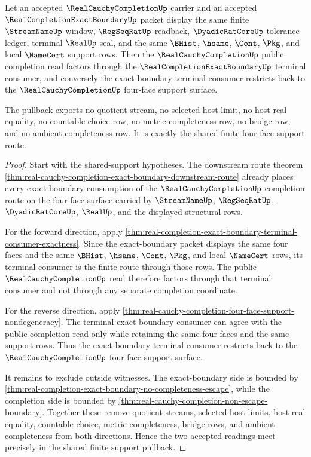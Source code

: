 \begin{theorem}
\label{thm:real-cauchy-completion-exact-boundary-bidirectional-pullback}
Let an accepted $\RealCauchyCompletionUp$ carrier and an accepted $\RealCompletionExactBoundaryUp$ packet display the same finite $\StreamNameUp$ window, $\RegSeqRatUp$ readback, $\DyadicRatCoreUp$ tolerance ledger, terminal $\RealUp$ seal, and the same $\BHist$, $\hsame$, $\Cont$, $\Pkg$, and local $\NameCert$ support rows. Then the $\RealCauchyCompletionUp$ public completion read factors through the $\RealCompletionExactBoundaryUp$ terminal consumer, and conversely the exact-boundary terminal consumer restricts back to the $\RealCauchyCompletionUp$ four-face support surface.

The pullback exports no quotient stream, no selected host limit, no host real equality, no countable-choice row, no metric-completeness row, no bridge row, and no ambient completeness row. It is exactly the shared finite four-face support route.
\end{theorem}
\begin{proof}
Start with the shared-support hypotheses. The downstream route theorem \autoref{thm:real-cauchy-completion-exact-boundary-downstream-route} already places every exact-boundary consumption of the $\RealCauchyCompletionUp$ completion route on the four-face surface carried by $\StreamNameUp$, $\RegSeqRatUp$, $\DyadicRatCoreUp$, $\RealUp$, and the displayed structural rows.

For the forward direction, apply \autoref{thm:real-completion-exact-boundary-terminal-consumer-exactness}. Since the exact-boundary packet displays the same four faces and the same $\BHist$, $\hsame$, $\Cont$, $\Pkg$, and local $\NameCert$ rows, its terminal consumer is the finite route through those rows. The public $\RealCauchyCompletionUp$ read therefore factors through that terminal consumer and not through any separate completion coordinate.

For the reverse direction, apply \autoref{thm:real-cauchy-completion-four-face-support-nondegeneracy}. The terminal exact-boundary consumer can agree with the public completion read only while retaining the same four faces and the same support rows. Thus the exact-boundary terminal consumer restricts back to the $\RealCauchyCompletionUp$ four-face support surface.

It remains to exclude outside witnesses. The exact-boundary side is bounded by \autoref{thm:real-completion-exact-boundary-no-completeness-escape}, while the completion side is bounded by \autoref{thm:real-cauchy-completion-non-escape-boundary}. Together these remove quotient streams, selected host limits, host real equality, countable choice, metric completeness, bridge rows, and ambient completeness from both directions. Hence the two accepted readings meet precisely in the shared finite support pullback.
\end{proof}

